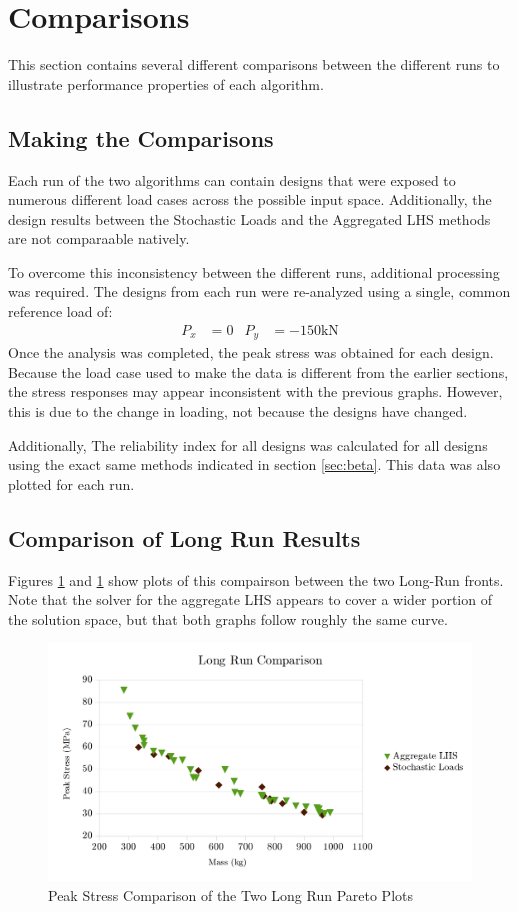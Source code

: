 \newpage
\section{Comparisons}
This section contains several different comparisons between the different runs to illustrate performance properties of each algorithm. 

\subsection{Making the Comparisons}
Each run of the two algorithms can contain designs that were exposed to numerous different load cases across the possible input space. Additionally, the design results between the Stochastic Loads and the Aggregated LHS methods are not comparaable natively. 

To overcome this inconsistency between the different runs, additional processing was required. The designs from each run were re-analyzed using a single, common reference load of: 
\begin{align*}
P_x &=0 &P_y &= -150 \text{kN}
\end{align*}
Once the analysis was completed, the peak stress was obtained for each design. Because the load case used to make the data is different from the earlier sections, the stress responses may appear inconsistent with the previous graphs. However, this is due to the change in loading, not because the designs have changed. 

Additionally, The reliability index for all designs was calculated for all designs using the exact same methods indicated in section \ref{sec:beta}. This data was also plotted for each run. 

\subsection{Comparison of Long Run Results}
Figures \ref{fig:pfront_comp_long} and \ref{fig:pfront_comp_long} show plots of this compairson between the two Long-Run fronts. Note that the solver for the aggregate LHS appears to cover a wider portion of the solution space, but that both graphs follow roughly the same curve. 

\begin{figure}[!htb]
\includegraphics[width=\textwidth]{img/pf_comp_long.png}
\caption{Peak Stress Comparison of the Two Long Run Pareto Plots}
\label{fig:pfront_comp_long}
\end{figure}

